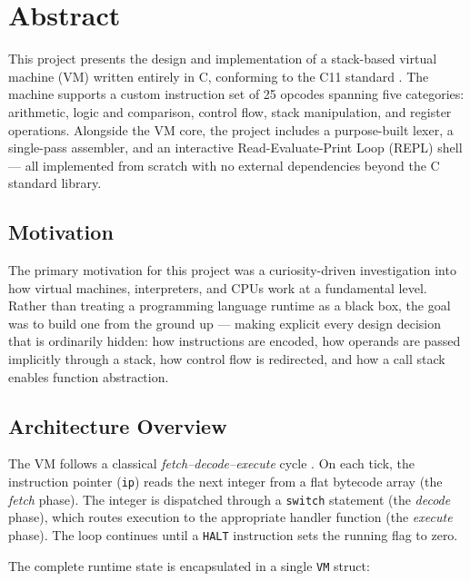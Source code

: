 \section{Abstract}

This project presents the design and implementation of a stack-based virtual machine (VM) written entirely in C, conforming to the C11 standard \cite{C11Standard}. The machine supports a custom instruction set of 25 opcodes spanning five categories: arithmetic, logic and comparison, control flow, stack manipulation, and register operations. Alongside the VM core, the project includes a purpose-built lexer, a single-pass assembler, and an interactive Read-Evaluate-Print Loop (REPL) shell — all implemented from scratch with no external dependencies beyond the C standard library.

\subsection*{Motivation}

The primary motivation for this project was a curiosity-driven investigation into how virtual machines, interpreters, and CPUs work at a fundamental level. Rather than treating a programming language runtime as a black box, the goal was to build one from the ground up — making explicit every design decision that is ordinarily hidden: how instructions are encoded, how operands are passed implicitly through a stack, how control flow is redirected, and how a call stack enables function abstraction.

\subsection*{Architecture Overview}

The VM follows a classical \textit{fetch–decode–execute} cycle \cite{ComputerArchitecture}. On each tick, the instruction pointer (\texttt{ip}) reads the next integer from a flat bytecode array (the \textit{fetch} phase). The integer is dispatched through a \texttt{switch} statement (the \textit{decode} phase), which routes execution to the appropriate handler function (the \textit{execute} phase). The loop continues until a \texttt{HALT} instruction sets the running flag to zero.

The complete runtime state is encapsulated in a single \texttt{VM} struct:

